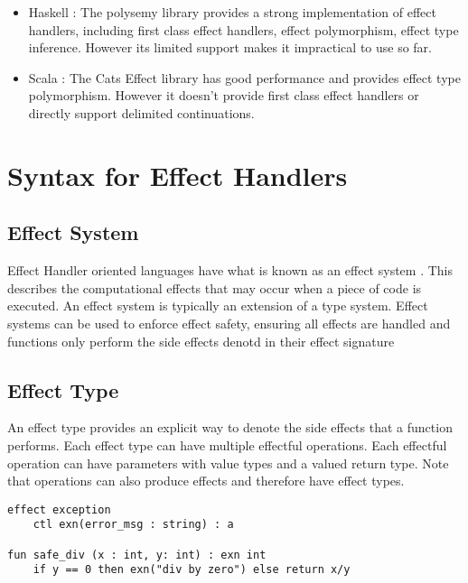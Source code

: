 \documentclass[logo,bsc,singlespacing,parskip]{infthesis}
\begin{document}
\begin{itemize}
    \item Haskell \cite{haskell_effects}: The polysemy library provides a strong implementation of effect handlers, including first class effect handlers, effect polymorphism, effect type inference. However its limited support makes it impractical to use so far.
    \item Scala \cite{scala_effects}: The Cats Effect library has good performance and provides effect type polymorphism. However it doesn’t provide first class effect handlers or directly support delimited continuations.
\end{itemize}

\section{Syntax for Effect Handlers}

\subsection{Effect System}
Effect Handler oriented languages have what is known as an effect system \cite{bauer_effect_2013}. This describes the computational effects that may occur when a piece of code is executed. An effect system is typically an extension of a type system. Effect systems can be used to enforce effect safety, ensuring all effects are handled and functions only perform the side effects denotd in their effect signature







\subsection{Effect Type}
An effect type provides an explicit way to denote the side effects that a function performs. Each effect type can have multiple effectful operations. Each effectful operation can have parameters with value types and a valued return type. Note that operations can also produce effects and therefore have effect types.

\begin{lstlisting}
effect exception
    ctl exn(error_msg : string) : a 

fun safe_div (x : int, y: int) : exn int
    if y == 0 then exn("div by zero") else return x/y
\end{lstlisting}
\end{document}
